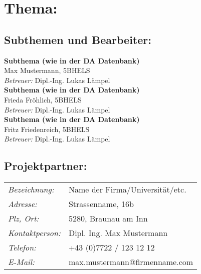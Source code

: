 

\chapter*{Thema: \newline \htlArbeitsthema }



\section*{Subthemen und Bearbeiter:}


\textbf{Subthema (wie in der DA Datenbank)}\\ 
Max Mustermann, 5BHELS\\
\emph{Betreuer:} Dipl.-Ing. Lukas Lämpel\\[2ex] 
%
\textbf{Subthema (wie in der DA Datenbank)}\\ 
Frieda Fröhlich, 5BHELS\\
\emph{Betreuer:} Dipl.-Ing. Lukas Lämpel\\[2ex] 
%
\textbf{Subthema (wie in der DA Datenbank)}\\ 
Fritz Friedenreich, 5BHELS\\
\emph{Betreuer:} Dipl.-Ing. Lukas Lämpel\\[2em]



\section*{Projektpartner:}

\renewcommand{\arraystretch}{1.5}
\begin{tabularx}{1\textwidth}{@{} l X @{}}

\emph{Bezeichnung:} & Name der Firma/Universität/etc.\\
\emph{Adresse:} & Strassenname, 16b\\
\emph{Plz, Ort:} & 5280, Braunau am Inn\\
\emph{Kontaktperson:} & Dipl. Ing. Max Mustermann\\
\emph{Telefon:} & +43 (0)7722 / 123 12 12\\
\emph{E-Mail:} & max.mustermann@firmenname.com\\

\end{tabularx}
